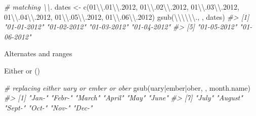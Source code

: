 \documentclass[
]{book}
\newenvironment{Shaded}{\begin{snugshade}}{\end{snugshade}}
\newcommand{\CommentTok}[1]{\textcolor[rgb]{0.56,0.35,0.01}{\textit{#1}}}
\newcommand{\FunctionTok}[1]{\textcolor[rgb]{0.00,0.00,0.00}{#1}}
\newcommand{\NormalTok}[1]{#1}
\newcommand{\OtherTok}[1]{\textcolor[rgb]{0.56,0.35,0.01}{#1}}
\newcommand{\SpecialCharTok}[1]{\textcolor[rgb]{0.00,0.00,0.00}{#1}}
\newcommand{\StringTok}[1]{\textcolor[rgb]{0.31,0.60,0.02}{#1}}
\begin{document}
\begin{Shaded}
\begin{Highlighting}[]
\CommentTok{\# matching \textbackslash{}\textbackslash{}.}
\NormalTok{dates }\OtherTok{\textless{}{-}} 
  \FunctionTok{c}\NormalTok{(}\StringTok{\textquotesingle{}01}\SpecialCharTok{\textbackslash{}\textbackslash{}}\StringTok{.01}\SpecialCharTok{\textbackslash{}\textbackslash{}}\StringTok{.2012\textquotesingle{}}\NormalTok{, }\StringTok{\textquotesingle{}01}\SpecialCharTok{\textbackslash{}\textbackslash{}}\StringTok{.02}\SpecialCharTok{\textbackslash{}\textbackslash{}}\StringTok{.2012\textquotesingle{}}\NormalTok{, }\StringTok{\textquotesingle{}01}\SpecialCharTok{\textbackslash{}\textbackslash{}}\StringTok{.03}\SpecialCharTok{\textbackslash{}\textbackslash{}}\StringTok{.2012\textquotesingle{}}\NormalTok{, }
    \StringTok{\textquotesingle{}01}\SpecialCharTok{\textbackslash{}\textbackslash{}}\StringTok{.04}\SpecialCharTok{\textbackslash{}\textbackslash{}}\StringTok{.2012\textquotesingle{}}\NormalTok{, }\StringTok{\textquotesingle{}01}\SpecialCharTok{\textbackslash{}\textbackslash{}}\StringTok{.05}\SpecialCharTok{\textbackslash{}\textbackslash{}}\StringTok{.2012\textquotesingle{}}\NormalTok{, }\StringTok{\textquotesingle{}01}\SpecialCharTok{\textbackslash{}\textbackslash{}}\StringTok{.06}\SpecialCharTok{\textbackslash{}\textbackslash{}}\StringTok{.2012\textquotesingle{}}\NormalTok{)}
\FunctionTok{gsub}\NormalTok{(}\StringTok{\textquotesingle{}}\SpecialCharTok{\textbackslash{}\textbackslash{}\textbackslash{}\textbackslash{}\textbackslash{}\textbackslash{}}\StringTok{.\textquotesingle{}}\NormalTok{, }\StringTok{\textquotesingle{}{-}\textquotesingle{}}\NormalTok{, dates)}
\CommentTok{\#\textgreater{} [1] "01{-}01{-}2012" "01{-}02{-}2012" "01{-}03{-}2012" "01{-}04{-}2012"}
\CommentTok{\#\textgreater{} [5] "01{-}05{-}2012" "01{-}06{-}2012"}
\end{Highlighting}
\end{Shaded}

Alternates and ranges

Either or (\textbar)

\begin{Shaded}
\begin{Highlighting}[]
\CommentTok{\# replacing either uary or ember or ober}
\FunctionTok{gsub}\NormalTok{(}\StringTok{\textquotesingle{}uary|ember|ober\textquotesingle{}}\NormalTok{, }\StringTok{\textquotesingle{}{-}\textquotesingle{}}\NormalTok{, month.name)}
\CommentTok{\#\textgreater{}  [1] "Jan{-}"   "Febr{-}"  "March"  "April"  "May"    "June"  }
\CommentTok{\#\textgreater{}  [7] "July"   "August" "Sept{-}"  "Oct{-}"   "Nov{-}"   "Dec{-}"}
\end{Highlighting}
\end{Shaded}
\end{document}
